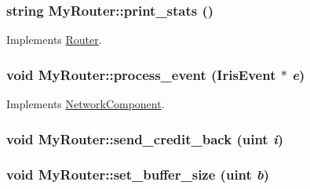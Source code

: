 \hypertarget{classMyRouter_ce28b171a1f2f93fa96f9d6a65fadbbe}{
\subsubsection[{print\_\-stats}]{\setlength{\rightskip}{0pt plus 5cm}string MyRouter::print\_\-stats ()}}
\label{classMyRouter_ce28b171a1f2f93fa96f9d6a65fadbbe}




Implements \hyperlink{classRouter_75995624d8bd533a9d3eb8c06a62ce07}{Router}.\hypertarget{classMyRouter_5dcfef46ad281c05de8e8c1bdf236a4a}{
\subsubsection[{process\_\-event}]{\setlength{\rightskip}{0pt plus 5cm}void MyRouter::process\_\-event ({\bf IrisEvent} $\ast$ {\em e})}}
\label{classMyRouter_5dcfef46ad281c05de8e8c1bdf236a4a}




Implements \hyperlink{classNetworkComponent_c93793eea1e2d424abe86e110ca8b399}{NetworkComponent}.\hypertarget{classMyRouter_bcfd73d0faaa8a191cd4ece957f3773b}{
\subsubsection[{send\_\-credit\_\-back}]{\setlength{\rightskip}{0pt plus 5cm}void MyRouter::send\_\-credit\_\-back ({\bf uint} {\em i})}}
\label{classMyRouter_bcfd73d0faaa8a191cd4ece957f3773b}


\hypertarget{classMyRouter_ee56704d0e9366dae6c26bdf90bc6343}{
\subsubsection[{set\_\-buffer\_\-size}]{\setlength{\rightskip}{0pt plus 5cm}void MyRouter::set\_\-buffer\_\-size ({\bf uint} {\em b})}}
\label{classMyRouter_ee56704d0e9366dae6c26bdf90bc6343}


